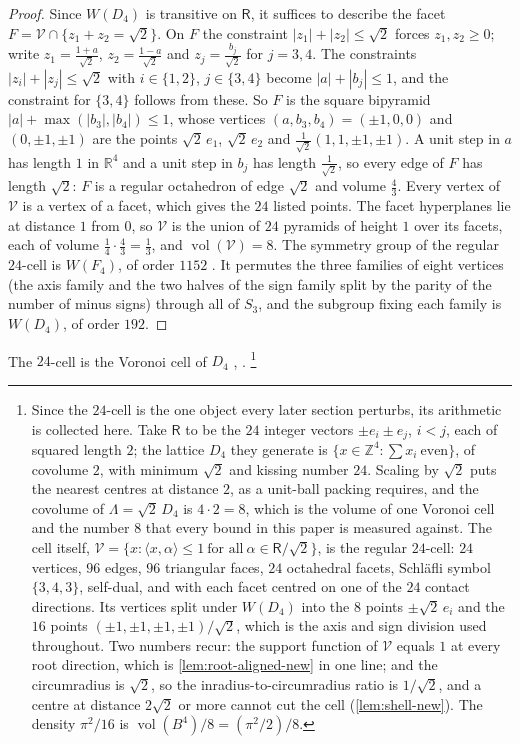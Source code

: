 \documentclass[11pt,reqno]{amsart}
\renewcommand{\_}{\origunderscore\allowbreak}
\numberwithin{equation}{section}
\theoremstyle{plain}
\theoremstyle{definition}
\theoremstyle{remark}
\newcommand{\Rt}{\mathsf{R}}                 %
\newcommand{\Latt}{\Lambda}                  %
\newcommand{\VCell}{\mathcal{V}}             %
\DeclareMathOperator{\vol}{vol}
\begin{document}
\begin{proof}
Since $W(D_4)$ is transitive on $\Rt$, it suffices to describe the facet
$F=\VCell\cap\{z_1+z_2=\sqrt2\}$. On $F$ the constraint $|z_1|+|z_2|\le\sqrt2$
forces $z_1,z_2\ge0$; write $z_1=\frac{1+a}{\sqrt2}$, $z_2=\frac{1-a}{\sqrt2}$
and $z_j=\frac{b_j}{\sqrt2}$ for $j=3,4$. The constraints
$|z_i|+|z_j|\le\sqrt2$ with $i\in\{1,2\}$, $j\in\{3,4\}$ become
$|a|+|b_j|\le1$, and the constraint for $\{3,4\}$ follows from these. So $F$
is the square bipyramid $|a|+\max(|b_3|,|b_4|)\le1$, whose vertices
$(a,b_3,b_4)=(\pm1,0,0)$ and $(0,\pm1,\pm1)$ are the points $\sqrt2\,e_1$,
$\sqrt2\,e_2$ and $\frac1{\sqrt2}(1,1,\pm1,\pm1)$. A unit step in $a$ has length
$1$ in $\mathbb{R}^4$ and a unit step in $b_j$ has length $\frac1{\sqrt2}$,
so every edge of $F$ has length $\sqrt2$: $F$ is a regular octahedron of edge
$\sqrt2$ and volume $\frac43$. Every vertex of $\VCell$ is a vertex of a
facet, which gives the $24$ listed points. The facet hyperplanes lie at
distance $1$ from $0$, so $\VCell$ is the union of $24$ pyramids of height
$1$ over its facets, each of volume $\frac14\cdot\frac43=\frac13$, and
$\vol(\VCell)=8$. The symmetry group of the regular $24$-cell is $W(F_4)$,
of order $1152$ \cite[\S 8.2]{Cox73}. It permutes the three families of
eight vertices (the axis family and the two halves of the sign family split
by the parity of the number of minus signs) through all of $S_3$, and the
subgroup fixing each family is $W(D_4)$, of order $192$.
\end{proof}

The $24$-cell is the Voronoi cell of $D_4$ \cite[Ch.~VIII]{Cox73},
\cite[Ch.~4]{CS1988}.%
\footnote{Since the $24$-cell is the one object every later section
  perturbs, its arithmetic is collected here. Take $\Rt$ to
  be the $24$ integer vectors $\pm e_i\pm e_j$, $i<j$, each of squared
  length $2$; the lattice $D_4$ they generate is
  $\{x\in\mathbb{Z}^4:\sum x_i\ \text{even}\}$, of covolume $2$, with
  minimum $\sqrt2$ and kissing number $24$. Scaling by $\sqrt2$ puts the
  nearest centres at distance $2$, as a unit-ball packing requires, and
  the covolume of $\Latt=\sqrt2\,D_4$ is $4\cdot2=8$, which is the volume of one Voronoi
  cell and the number $8$ that every bound in this paper is measured
  against. The cell itself, $\VCell=\{x:\langle
  x,\alpha\rangle\le1\ \text{for all}\ \alpha\in\Rt/\sqrt2\}$, is the
  regular $24$-cell: $24$ vertices, $96$ edges, $96$ triangular faces,
  $24$ octahedral facets, Schl\"afli symbol $\{3,4,3\}$, self-dual, and
  with each facet centred on one of the $24$ contact directions. Its
  vertices split under $W(D_4)$ into the $8$ points $\pm\sqrt2\,e_i$ and
  the $16$ points $(\pm1,\pm1,\pm1,\pm1)/\sqrt2$, which is the axis and
  sign division used throughout. Two numbers recur: the support function
  of $\VCell$ equals $1$ at every root direction, which is
  \cref{lem:root-aligned-new} in one line; and the circumradius is
  $\sqrt2$, so the inradius-to-circumradius ratio is $1/\sqrt2$, and a
  centre at distance $2\sqrt2$ or more cannot cut the cell
  (\cref{lem:shell-new}). The density $\pi^2/16$ is
  $\vol(B^4)/8=(\pi^2/2)/8$.}
\end{document}
